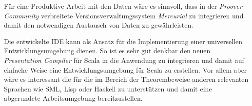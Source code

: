 Für eine Produktive Arbeit mit den Daten wäre es sinnvoll, dass in der \textit{Proover Community}
verbreitete Versionsverwaltungssystem \textit{Mercurial} zu integrieren und damit den notwendigen
Austausch von Daten zu gewährleisten.

Die entwickelte IDE kann als Ansatz für die Implementierung einer universellen Entwicklungsumgebung
dienen. So ist es sehr gut denkbar den neuen \textit{Presentation Compiler} für Scala in die
Anwendung zu integrieren und damit auf einfache Weise eine Entwicklungsumgebung für Scala zu
erstellen. Vor allem aber wäre es interessant die für die im Bereich der Theorembeweise anderen
relevanten Sprachen wie SML, Lisp oder Haskell zu unterstützen und damit eine abgerundete
Arbeitsumgebung bereitzustellen.